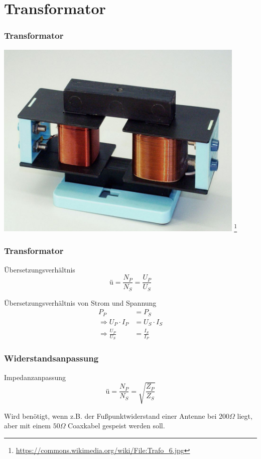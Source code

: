 \section*{Transformator}
\begin{frame}
  \frametitle{Transformator}
  \begin{center}
    \includegraphics[width=0.9\textwidth,height=.8\textheight,keepaspectratio]{a03/trafo-Real.jpg}
    \footnote{\tiny \url{https://commons.wikimedia.org/wiki/File:Trafo_6.jpg}}
  \end{center}
\end{frame}

\begin{frame}
  \frametitle{Transformator}
  \begin{block}{Übersetzungsverhältnis}
    $$\text{\"u} = \frac{N_P}{N_S} = \frac{U_P}{U_S} $$
  \end{block}
  \vspace{2em}
  \begin{block}{Übersetzungsverhältnis von Strom und Spannung}
    \begin{align*}
      P_P &= P_S\\
      \Rightarrow U_{P} \cdot I_P &= U_{S} \cdot I_S\\
      \Rightarrow \frac{U_P}{U_S} &= \frac{I_S}{I_P}
    \end{align*}
  \end{block}
\end{frame}

\begin{frame}
  \frametitle{Widerstandsanpassung}
  \begin{block}{Impedanzanpassung}
    $$\text{\"u} = \frac{N_P}{N_S} = \sqrt{\frac{Z_P}{Z_S}}$$
  \end{block}
  \vspace{2em}
  Wird benötigt, wenn z.B. der Fußpunktwiderstand einer Antenne bei $200\Omega$ liegt, aber mit einem $50\Omega$ Coaxkabel gespeist werden soll.
\end{frame}

